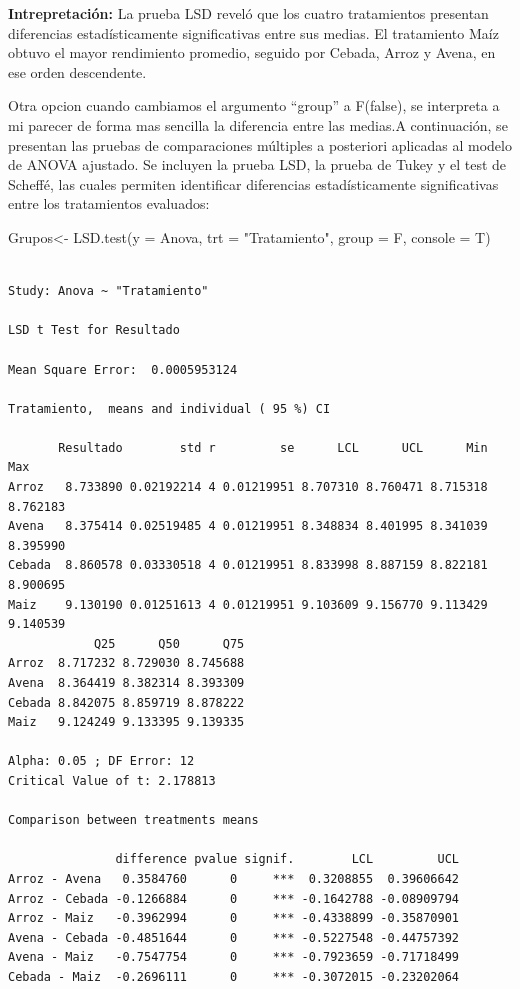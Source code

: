 \documentclass[
  letterpaper,
  DIV=11,
  numbers=noendperiod]{scrreprt}
\newenvironment{Shaded}{\begin{snugshade}}{\end{snugshade}}
\newcommand{\AttributeTok}[1]{\textcolor[rgb]{0.40,0.45,0.13}{#1}}
\newcommand{\FunctionTok}[1]{\textcolor[rgb]{0.28,0.35,0.67}{#1}}
\newcommand{\NormalTok}[1]{\textcolor[rgb]{0.00,0.23,0.31}{#1}}
\newcommand{\OtherTok}[1]{\textcolor[rgb]{0.00,0.23,0.31}{#1}}
\newcommand{\StringTok}[1]{\textcolor[rgb]{0.13,0.47,0.30}{#1}}
\begin{document}
\textbf{Intrepretación:} La prueba LSD reveló que los cuatro
tratamientos presentan diferencias estadísticamente significativas entre
sus medias. El tratamiento Maíz obtuvo el mayor rendimiento promedio,
seguido por Cebada, Arroz y Avena, en ese orden descendente.

Otra opcion cuando cambiamos el argumento ``group'' a F(false), se
interpreta a mi parecer de forma mas sencilla la diferencia entre las
medias.A continuación, se presentan las pruebas de comparaciones
múltiples a posteriori aplicadas al modelo de ANOVA ajustado. Se
incluyen la prueba LSD, la prueba de Tukey y el test de Scheffé, las
cuales permiten identificar diferencias estadísticamente significativas
entre los tratamientos evaluados:

\begin{Shaded}
\begin{Highlighting}[]
\NormalTok{Grupos}\OtherTok{\textless{}{-}} \FunctionTok{LSD.test}\NormalTok{(}\AttributeTok{y =}\NormalTok{ Anova, }\AttributeTok{trt =} \StringTok{"Tratamiento"}\NormalTok{, }\AttributeTok{group =}\NormalTok{ F, }\AttributeTok{console =}\NormalTok{ T)}
\end{Highlighting}
\end{Shaded}

\begin{verbatim}

Study: Anova ~ "Tratamiento"

LSD t Test for Resultado 

Mean Square Error:  0.0005953124 

Tratamiento,  means and individual ( 95 %) CI

       Resultado        std r         se      LCL      UCL      Min      Max
Arroz   8.733890 0.02192214 4 0.01219951 8.707310 8.760471 8.715318 8.762183
Avena   8.375414 0.02519485 4 0.01219951 8.348834 8.401995 8.341039 8.395990
Cebada  8.860578 0.03330518 4 0.01219951 8.833998 8.887159 8.822181 8.900695
Maiz    9.130190 0.01251613 4 0.01219951 9.103609 9.156770 9.113429 9.140539
            Q25      Q50      Q75
Arroz  8.717232 8.729030 8.745688
Avena  8.364419 8.382314 8.393309
Cebada 8.842075 8.859719 8.878222
Maiz   9.124249 9.133395 9.139335

Alpha: 0.05 ; DF Error: 12
Critical Value of t: 2.178813 

Comparison between treatments means

               difference pvalue signif.        LCL         UCL
Arroz - Avena   0.3584760      0     ***  0.3208855  0.39606642
Arroz - Cebada -0.1266884      0     *** -0.1642788 -0.08909794
Arroz - Maiz   -0.3962994      0     *** -0.4338899 -0.35870901
Avena - Cebada -0.4851644      0     *** -0.5227548 -0.44757392
Avena - Maiz   -0.7547754      0     *** -0.7923659 -0.71718499
Cebada - Maiz  -0.2696111      0     *** -0.3072015 -0.23202064
\end{verbatim}
\end{document}
